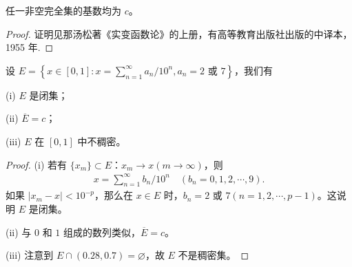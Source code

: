 \documentclass[../../main.tex]{subfiles}%
\begin{document}
\begin{proposition}
任一非空完全集的基数均为 \(c\)。
\end{proposition}
\begin{proof}
证明见那汤松著《实变函数论》的上册，有高等教育出版社出版的中译本，1955 年.
\end{proof}

\begin{example}
设 \(E = \left\{x\in[0,1]: x = \sum_{n = 1}^{\infty}a_n/10^n, a_n = 2 \text{ 或 } 7\right\}\)，我们有

(i) \(E\) 是闭集； 

(ii) \(\overline{E}=c\)； 

(iii) \(E\) 在 \([0,1]\) 中不稠密。
\end{example}
\begin{proof}
(i) 若有 \(\{x_m\}\subset E\)：\(x_m\rightarrow x (m\rightarrow\infty)\)，则
\begin{align*}
x = \sum_{n = 1}^{\infty}b_n/10^n \quad (b_n = 0,1,2,\cdots,9).
\end{align*}
如果 \(|x_m - x|<10^{-p}\)，那么在 \(x\in E\) 时，\(b_n = 2 \text{ 或 } 7 (n = 1,2,\cdots,p - 1)\)。这说明 \(E\) 是闭集。

(ii) 与 \(0\) 和 \(1\) 组成的数列类似，\(\overline{E}=c\)。

(iii) 注意到 \(E\cap(0.28,0.7)=\varnothing\)，故 \(E\) 不是稠密集。 
\end{proof}
\end{document}

